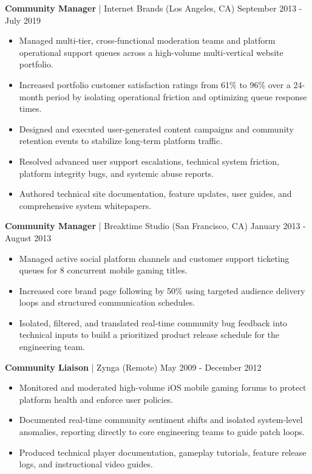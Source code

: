\documentclass[10pt,letterpaper]{article}
\begin{document}
\textbf{Community Manager} | Internet Brands (Los Angeles, CA) \hfill September 2013 - July 2019
\begin{itemize}
    \item Managed multi-tier, cross-functional moderation teams and platform operational support queues across a high-volume multi-vertical website portfolio.
    \item Increased portfolio customer satisfaction ratings from 61\% to 96\% over a 24-month period by isolating operational friction and optimizing queue response times.
    \item Designed and executed user-generated content campaigns and community retention events to stabilize long-term platform traffic.
    \item Resolved advanced user support escalations, technical system friction, platform integrity bugs, and systemic abuse reports.
    \item Authored technical site documentation, feature updates, user guides, and comprehensive system whitepapers.
\end{itemize}

\textbf{Community Manager} | Breaktime Studio (San Francisco, CA) \hfill January 2013 - August 2013
\begin{itemize}
    \item Managed active social platform channels and customer support ticketing queues for 8 concurrent mobile gaming titles.
    \item Increased core brand page following by 50\% using targeted audience delivery loops and structured communication schedules.
    \item Isolated, filtered, and translated real-time community bug feedback into technical inputs to build a prioritized product release schedule for the engineering team.
\end{itemize}

\textbf{Community Liaison} | Zynga (Remote) \hfill May 2009 - December 2012
\begin{itemize}
    \item Monitored and moderated high-volume iOS mobile gaming forums to protect platform health and enforce user policies.
    \item Documented real-time community sentiment shifts and isolated system-level anomalies, reporting directly to core engineering teams to guide patch loops.
    \item Produced technical player documentation, gameplay tutorials, feature release logs, and instructional video guides.
\end{itemize}
\end{document}
